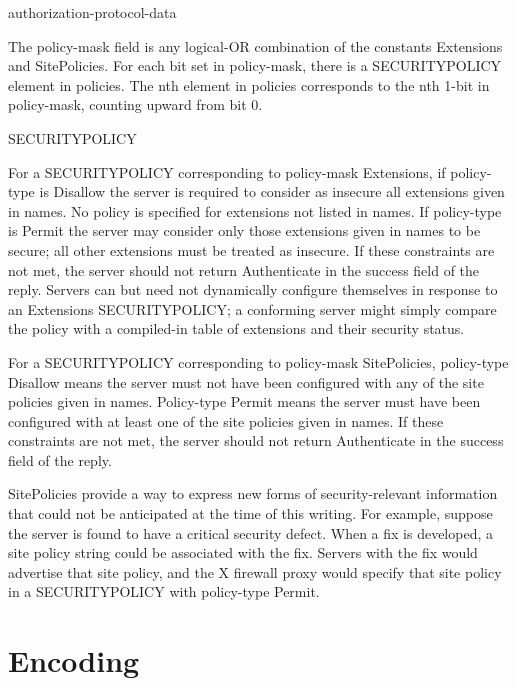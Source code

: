 \begin{arequest}{authorization-protocol-data}
\end{arequest}

The policy-mask field is any logical-OR combination of the constants
Extensions and SitePolicies.  For each bit set in policy-mask, there
is a SECURITYPOLICY element in policies.  The nth element in policies
corresponds to the nth 1-bit in policy-mask, counting upward from bit
0.

\begin{arequest}{SECURITYPOLICY}
\end{arequest}

For a SECURITYPOLICY corresponding to policy-mask Extensions, if
policy-type is Disallow the server is required to consider as insecure
all extensions given in names.  No policy is specified for extensions
not listed in names.  If policy-type is Permit the server may consider
only those extensions given in names to be secure; all other
extensions must be treated as insecure.  If these constraints are not
met, the server should not return Authenticate in the success field of
the reply.  Servers can but need not dynamically configure themselves
in response to an Extensions SECURITYPOLICY; a conforming server might
simply compare the policy with a compiled-in table of extensions and
their security status.


For a SECURITYPOLICY corresponding to policy-mask SitePolicies,
policy-type Disallow means the server must not have been configured
with any of the site policies given in names.  Policy-type Permit
means the server must have been configured with at least one of the
site policies given in names.  If these constraints are not met, the
server should not return Authenticate in the success field of the
reply.

SitePolicies provide a way to express new forms of security-relevant
information that could not be anticipated at the time of this writing.
For example, suppose the server is found to have a critical security
defect.  When a fix is developed, a site policy string could be
associated with the fix.  Servers with the fix would advertise that
site policy, and the X firewall proxy would specify that site policy
in a SECURITYPOLICY with policy-type Permit.

\section{Encoding}

